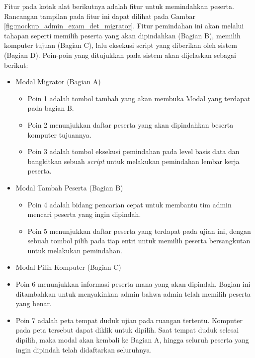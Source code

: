    Fitur pada kotak alat berikutnya adalah fitur untuk memindahkan peserta.
    Rancangan tampilan pada fitur ini dapat dilihat pada Gambar
    \ref{fig:mockup_admin_exam_det_migrator}. Fitur pemindahan ini akan melalui
    tahapan seperti memilih peserta yang akan dipindahkan (Bagian B), memilih
    komputer tujuan (Bagian C), lalu eksekusi script yang diberikan oleh sistem
    (Bagian D). Poin-poin yang ditujukkan pada sistem akan dijelaskan sebagai
    berikut:
    \begin{itemize}
        \item Modal Migrator (Bagian A)
            \begin{itemize}
                \item Poin 1 adalah tombol tambah yang akan membuka Modal yang
                    terdapat pada bagian B.
                
                \item Poin 2 menunjukkan daftar peserta yang akan dipindahkan
                    beserta komputer tujuannya.
                
                \item Poin 3 adalah tombol eksekusi pemindahan pada level basis
                    data dan bangkitkan sebuah \textit{script} untuk melakukan
                    pemindahan lembar kerja peserta.
            \end{itemize}
        
        \item Modal Tambah Peserta (Bagian B)
            \begin{itemize}
                \item Poin 4 adalah bidang pencarian cepat untuk membantu tim
                    admin mencari peserta yang ingin dipindah.
                    
                \item Poin 5 menunjukkan daftar peserta yang terdapat pada ujian
                    ini, dengan sebuah tombol pilih pada tiap entri untuk
                    memilih peserta bersangkutan untuk melakukan pemindahan.
            \end{itemize}
            
        \item Modal Pilih Komputer (Bagian C)
            \item Poin 6 menunjukkan informasi peserta mana yang akan dipindah.
                Bagian ini ditambahkan untuk menyakinkan admin bahwa admin telah
                memilih peserta yang benar.
                
            \item Poin 7 adalah peta tempat duduk ujian pada ruangan tertentu.
                Komputer pada peta tersebut dapat diklik untuk dipilih. Saat
                tempat duduk selesai dipilih, maka modal akan kembali ke Bagian
                A, hingga seluruh peserta yang ingin dipindah telah didaftarkan
                seluruhnya.
    \end{itemize}
    
